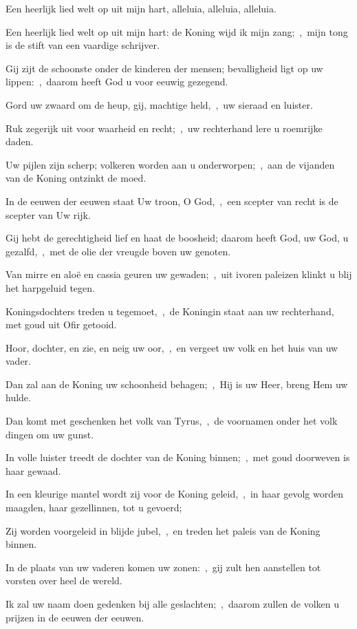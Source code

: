 \documentclass[12pt,twoside,a5paper]{article}
\begin{document}
\begin{halfparskip}
  Een heerlijk lied welt op uit mijn hart, alleluia, alleluia, alleluia.

  Een heerlijk lied welt op uit mijn hart: de Koning wijd ik mijn zang;~\sep\ mijn tong is de stift van een vaardige schrijver.

  Gij zijt de schoonste onder de kinderen der mensen; bevalligheid ligt op uw lippen:~\sep\ daarom heeft God u voor eeuwig gezegend.

  Gord uw zwaard om de heup, gij, machtige held,~\sep\ uw sieraad en luister.

  Ruk zegerijk uit voor waarheid en recht;~\sep\ uw rechterhand lere u roemrijke daden.

  Uw pijlen zijn scherp; volkeren worden aan u onderworpen;~\sep\ aan de vijanden van de Koning ontzinkt de moed.

  In de eeuwen der eeuwen staat Uw troon, O God,~\sep\ een scepter van recht is de scepter van Uw rijk.

  Gij hebt de gerechtigheid lief en haat de boosheid; daarom heeft God, uw God, u gezalfd,~\sep\ met de olie der vreugde boven uw genoten.

  Van mirre en aloë en cassia geuren uw gewaden;~\sep\ uit ivoren paleizen klinkt u blij het harpgeluid tegen.

  Koningsdochters treden u tegemoet,~\sep\ de Koningin staat aan uw rechterhand, met goud uit Ofir getooid.

  Hoor, dochter, en zie, en neig uw oor,~\sep\ en vergeet uw volk en het huis van uw vader.

  Dan zal aan de Koning uw schoonheid behagen;~\sep\ Hij is uw Heer, breng Hem uw hulde.

  Dan komt met geschenken het volk van Tyrus,~\sep\ de voornamen onder het volk dingen om uw gunst.

  In volle luister treedt de dochter van de Koning binnen;~\sep\ met goud doorweven is haar gewaad.

  In een kleurige mantel wordt zij voor de Koning geleid,~\sep\ in haar gevolg worden maagden, haar gezellinnen, tot u gevoerd;

  Zij worden voorgeleid in blijde jubel,~\sep\ en treden het paleis van de Koning binnen.

  In de plaats van uw vaderen komen uw zonen:~\sep\ gij zult hen aanstellen tot vorsten over heel de wereld.

  Ik zal uw naam doen gedenken bij alle geslachten;~\sep\ daarom zullen de volken u prijzen in de eeuwen der eeuwen.
\end{halfparskip}
\end{document}

